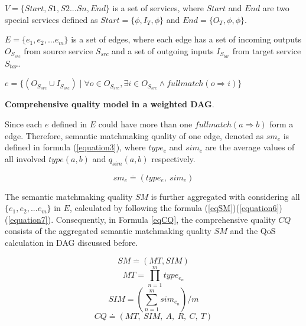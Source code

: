 \documentclass{llncs}
\begin{document}
$V=\{Start, S1, S2...Sn, End\}$ is a set of services, where $Start$ and $End$ are two special services defined as $Start = \{ \phi, I_T, \phi \}$ and $End  = \{ O_T, \phi, \phi \}$. 

$E = \{e_{1}, e_{2},... e_{m} \}$ is a set of edges, where each edge has a set of incoming outputs $O_{S_{src}}$ from source service $S_{src}$ and a set of outgoing inputs $I_{S_{tar}}$ from target service $S_{tar}$. 

$e = \{ (O_{S_{src}} \cup I_{S_{src}}) \mid \forall o \in O_{S_{src}}, \exists i \in O_{S_{src}} \wedge fullmatch (o \Rightarrow i) \}$
\vspace{0.3cm}

\textbf{Comprehensive quality model in a weighted DAG}. 

Since each $e$ defined in $E$ could have more than one $fullmatch(a \Rightarrow b)$ form a edge. Therefore, semantic matchmaking quality of one edge, denoted as $sm_e$ is defined in formula (\ref{equation3}), where $type_{e}$ and $sim_{e}$ are the average values of all involved $type(a, b)$ and $q_{sim}(a, b)$ respectively. 

\begin{equation}
\label{equation3}
sm_{e} \stackrel{.}{=} (type_ {e}, \  sim_ {e})
\end{equation}

The semantic matchmaking quality $SM$ is further aggregated with considering all $\{e_{1}, e_{2},... e_{m} \}$ in $E$, calculated by following the formula (\ref{eqSM})(\ref{equation6})(\ref{equation7}). Consequently, in Formula \ref{eqCQ}, the comprehensive quality $CQ$ consists of the aggregated semantic matchmaking quality $SM$ and the QoS calculation in DAG discussed before.

\begin{equation}
\label{eqSM}
SM \stackrel{.}{=} (MT, SIM)
\end{equation}
\begin{equation}
\label{equation6}
MT {=} \prod_{n=1}^{m} type_ {e_{n}}
\end{equation}
\begin{equation}
\label{equation7}
SIM {=} (\sum_{n=1}^m sim_ {e_{n}})/m
\end{equation}
\begin{equation}
\label{eqCQ}
CQ \stackrel{.}{=} (MT, \  SIM, \  A,\  R,\  C,\  T)
\end{equation}
\end{document}
